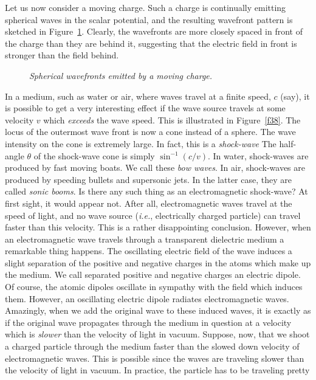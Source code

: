 Let us now consider a moving charge. Such a charge is continually emitting spherical waves in the
scalar potential, and the resulting  wavefront pattern is sketched in Figure~\ref{f37}.
Clearly, the wavefronts are more closely spaced in front of the charge than they are
behind it, suggesting
that the electric field in front is stronger than the field behind. 
\begin{figure}
\epsfysize=1.75in
\centerline{}
\caption{\em Spherical wavefronts emitted by a moving charge.}\label{f37}
\end{figure}
In a medium, such as  water or air, where
waves travel at a finite speed, $c$ (say), it is possible to get a very interesting effect
if the wave source travels at some velocity $v$ which {\em exceeds}\/ the wave speed. This
is illustrated in Figure~\ref{f38}.
The locus of the outermost wave front is now a cone instead of a sphere.
The wave intensity on the cone is extremely large. In fact, this is a {\em shock-wave}\/ The half-angle $\theta$
of the shock-wave cone is simply $\sin^{-1}(c/v)$. In water, shock-waves are produced by fast moving
boats. We call these {\em bow waves}. In air, shock-waves are produced by speeding bullets
and supersonic jets. In the latter case, they are called {\em sonic booms}. Is there any such thing
as an electromagnetic shock-wave? At first sight, it would appear not. After all, electromagnetic waves travel at the speed of light, and no wave source
({\em i.e.}, electrically charged particle) can travel faster than this velocity. This is
a rather disappointing conclusion. However, when an electromagnetic wave travels through a transparent dielectric medium
a remarkable thing happens. The oscillating electric field of the wave induces a slight
separation of the positive and negative charges in the atoms which
make up the medium.  We call separated positive and negative charges  an electric
dipole. Of course, the atomic dipoles oscillate in sympathy
with the field which induces them. However, an oscillating electric dipole  radiates electromagnetic
waves. Amazingly, when we add the original wave to these induced waves, it is exactly as if
the original wave propagates through the medium in question at a velocity which is
{\em slower}\/ than the velocity of light in  vacuum. 
Suppose, now, that we shoot a charged particle through the medium faster than the slowed down
velocity of electromagnetic waves. This is possible since the waves  are traveling slower
than the velocity of light in vacuum. In practice, the particle has to be traveling pretty
